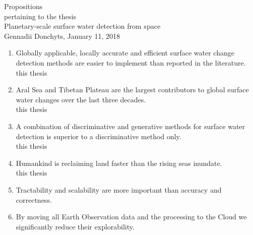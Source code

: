\documentclass[a4paper,oneside,10pt]{article}
\begin{document}

\pagestyle{empty}
{
\centering

{\LARGE Propositions \\}
\vspace{0.5cm}
{\large pertaining to the thesis \\}
\vspace{0.5cm}
{\LARGE Planetary-scale surface water detection from space \\ }
\vspace{0.5cm}
{\large Gennadii Donchyts, January 11, 2018 \\}
}


{
\newcommand{\citat}[1]{\smth \hfill {\small #1}}
\newcommand{\smth}{$\left.\right.$}


\begin{enumerate}

\item Globally applicable, locally accurate and efficient surface water change detection methods are easier to implement than reported in the literature.
\citat{this thesis}

\item Aral Sea and Tibetan Plateau are the largest contributors to global surface water changes over the last three decades. \\
\citat{this thesis}

\item A combination of discriminative and generative methods for surface water detection is superior to a discriminative method only. \\
\citat{this thesis}


\item Humankind is reclaiming land faster than the rising seas inundate. \\
\citat{this thesis}

\item Tractability and scalability are more important than accuracy and correctness. \\

\item By moving all Earth Observation data and the processing to the Cloud we significantly reduce their explorability. \\


\end{enumerate}}
\end{document}
